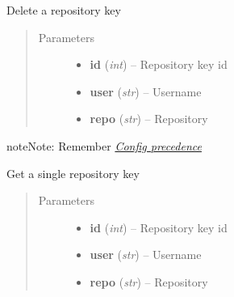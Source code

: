 \documentclass[letterpaper,10pt,english]{sphinxmanual}
\begin{document}
\begin{fulllineitems}
\begin{fulllineitems}
\end{fulllineitems}


\begin{fulllineitems}
\label{repos:pygithub3.services.repos.Keys.delete}
Delete a repository key
\begin{quote}\begin{description}
\item[{Parameters}] \leavevmode\begin{itemize}
\item {} 
\textbf{id} (\emph{int}) -- Repository key id

\item {} 
\textbf{user} (\emph{str}) -- Username

\item {} 
\textbf{repo} (\emph{str}) -- Repository

\end{itemize}

\end{description}\end{quote}

\begin{notice}{note}{Note:}
Remember {\hyperref[repos:config-precedence]{\emph{Config precedence}}}
\end{notice}

\end{fulllineitems}


\begin{fulllineitems}
\label{repos:pygithub3.services.repos.Keys.get}
Get a single repository key
\begin{quote}\begin{description}
\item[{Parameters}] \leavevmode\begin{itemize}
\item {} 
\textbf{id} (\emph{int}) -- Repository key id

\item {} 
\textbf{user} (\emph{str}) -- Username

\item {} 
\textbf{repo} (\emph{str}) -- Repository


\end{itemize}
\end{description}
\end{quote}
\end{fulllineitems}
\end{fulllineitems}
\end{document}
